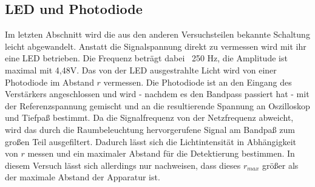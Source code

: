 \subsection{LED und Photodiode}
Im letzten Abschnitt wird die aus den anderen Versuchsteilen bekannte Schaltung
leicht abgewandelt. Anstatt die Signalspannung direkt zu vermessen wird mit ihr
eine LED betrieben. Die Frequenz beträgt dabei ~250 Hz, die Amplitude ist
maximal mit 4,48V. Das von der LED ausgestrahlte Licht wird von einer Photodiode
im Abstand $r$ vermessen. Die Photodiode ist an den Eingang des Verstärkers
angeschlossen und wird - nachdem es den Bandpass passiert hat - mit der
Referenzspannung gemischt und an die resultierende Spannung an
Oszilloskop und Tiefpaß bestimmt. Da die Signalfrequenz von der Netzfrequenz
abweicht, wird das durch die Raumbeleuchtung hervorgerufene Signal am Bandpaß
zum großen Teil ausgefiltert. Dadurch lässt sich die Lichtintensität in
Abhängigkeit von $r$ messen und ein maximaler Abstand für die Detektierung
bestimmen. In diesem Versuch lässt sich allerdings nur nachweisen, dass
dieses $r_{max}$ größer als der maximale Abstand der Apparatur ist.
